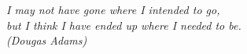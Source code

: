 \begin{epigrafe}[]
    \vspace*{\fill}
	\begin{flushright}

		\textit{I may not have gone where I intended to go, \\
			but I think I have ended up where I needed to be. \\
			(Dougas Adams)}
	\end{flushright}
\end{epigrafe}
